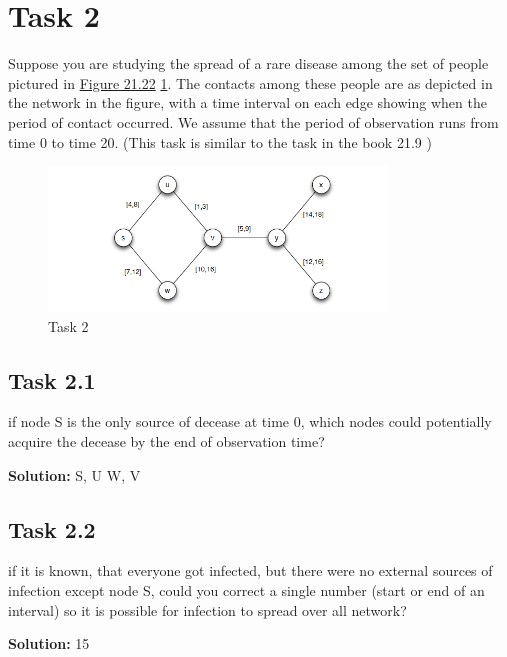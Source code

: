 \documentclass{cernatsnote}
\begin{document}
\section{Task 2}
Suppose you are studying the spread of a rare disease among the set of people pictured in \href{https://www.cs.cornell.edu/home/kleinber/networks-book/networks-book-ch21.pdf}{Figure 21.22} \ref{fig:task2}. The contacts among these people are as depicted in the network in the figure, with a time interval on each edge showing when the period of contact occurred. We assume that the period of observation runs from time 0 to time 20. (This task is similar to the task in the book 21.9 \cite{task2})

\begin{figure}[ht]
\centering
\includegraphics[width=0.8\textwidth]{images/task2.png}
\caption{\label{fig:task2} Task 2}
\end{figure}

\subsection{Task 2.1} 
if node S is the only source of decease at time 0, which nodes could potentially acquire the decease by the end of observation time? 

\textbf{Solution:} S, U W, V

\subsection{Task 2.2} 
if it is known, that everyone got infected, but there were no external sources of infection except node S, could you correct a single number (start or end of an interval) so it is possible for infection to spread over all network? 

\textbf{Solution:} 15

\end{document}
